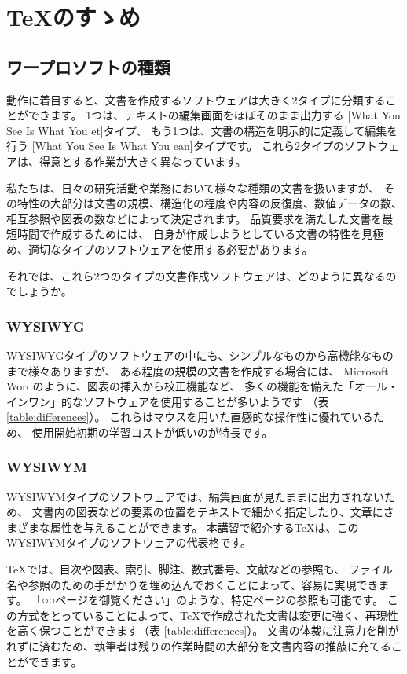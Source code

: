 \documentclass[TeXworkshop]{subfiles}
\begin{document}
\clearpage

\section{\TeX のすゝめ}

\subsection{ワープロソフトの種類}
動作に着目すると、文書を作成するソフトウェアは大きく2タイプに分類することができます。
1つは、テキストの編集画面をほぼそのまま出力する
[What You See Is What You et]タイプ、
もう1つは、文書の構造を明示的に定義して編集を行う
 [What You See Is What You ean]タイプです。
これら2タイプのソフトウェアは、得意とする作業が大きく異なっています。


私たちは、日々の研究活動や業務において様々な種類の文書を扱いますが、
その特性の大部分は文書の規模、構造化の程度や内容の反復度、数値データの数、相互参照や図表の数などによって決定されます。
品質要求を満たした文書を最短時間で作成するためには、
自身が作成しようとしている文書の特性を見極め、適切なタイプのソフトウェアを使用する必要があります。

それでは、これら2つのタイプの文書作成ソフトウェアは、どのように異なるのでしょうか。

\subsubsection{WYSIWYG}
WYSIWYGタイプのソフトウェアの中にも、シンプルなものから高機能なものまで様々ありますが、
ある程度の規模の文書を作成する場合には、
Microsoft Wordのように、図表の挿入から校正機能など、
多くの機能を備えた「オール・インワン」的なソフトウェアを使用することが多いようです
（表 \ref{table:differences}）。
これらはマウスを用いた直感的な操作性に優れているため、
使用開始初期の学習コストが低いのが特長です。


\subsubsection{WYSIWYM}
WYSIWYMタイプのソフトウェアでは、編集画面が見たままに出力されないため、
文書内の図表などの要素の位置をテキストで細かく指定したり、文章にさまざまな属性を与えることができます。
本講習で紹介する\TeX は、このWYSIWYMタイプのソフトウェアの代表格です。

\TeX では、目次や図表、索引、脚注、数式番号、文献などの参照も、
ファイル名や参照のための手がかりを埋め込んでおくことによって、容易に実現できます。
「○○ページを御覧ください」のような、特定ページの参照も可能です。
この方式をとっていることによって、\TeX で作成された文書は変更に強く、再現性を高く保つことができます（表 \ref{table:differences}）。 
文書の体裁に注意力を削がれずに済むため、執筆者は残りの作業時間の大部分を文書内容の推敲に充てることができます。
\end{document}
